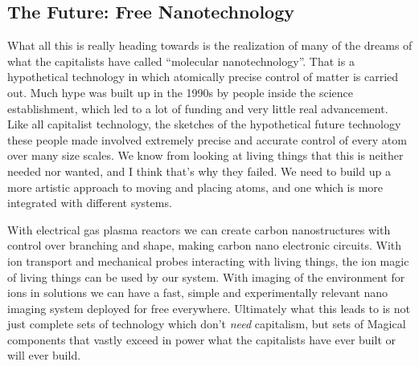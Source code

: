 \subsection{The Future: Free
Nanotechnology}\label{the-future-free-nanotechnology}

What all this is really heading towards is the realization of many of
the dreams of what the capitalists have called ``molecular
nanotechnology''. That is a hypothetical technology in which atomically
precise control of matter is carried out. Much hype was built up in the
1990s by people inside the science establishment, which led to a lot of
funding and very little real advancement. Like all capitalist
technology, the sketches of the hypothetical future technology these
people made involved extremely precise and accurate control of every
atom over many size scales. We know from looking at living things that
this is neither needed nor wanted, and I think that's why they failed.
We need to build up a more artistic approach to moving and placing
atoms, and one which is more integrated with different systems.

With electrical gas plasma reactors we can create carbon nanostructures
with control over branching and shape, making carbon nano electronic
circuits. With ion transport and mechanical probes interacting with
living things, the ion magic of living things can be used by our system.
With imaging of the environment for ions in solutions we can have a
fast, simple and experimentally relevant nano imaging system deployed
for free everywhere. Ultimately what this leads to is not just complete
sets of technology which don't \emph{need} capitalism, but sets of
Magical components that vastly exceed in power what the capitalists have
ever built or will ever build.
